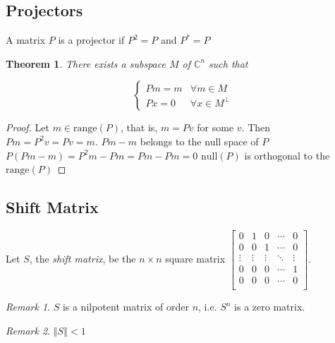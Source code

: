 \documentclass[twofold]{article}
\newcommand*\adj[1]{#1^*}
\newcommand*\norm[1]{\left \Vert #1 \right\Vert}
\theoremstyle{plain}
\newtheorem{theorem}{Theorem}
\theoremstyle{definition}
\theoremstyle{remark}
\newtheorem*{remark}{Remark}
\begin{document}
\subsection{Projectors}
A matrix \(P\) is a projector if \(P^2 = P\) and \(\adj{P} = P\)

\begin{theorem} There exists a subspace \(M\) of \(\mathbb{C}^n\) such that 

\[\begin{cases}
Pm = m & \forall m \in M \\
Px = 0 & \forall x \in M^\perp 
\end{cases}\] 
\end{theorem}
\begin{proof} Let \(m \in \mathrm{range}(P)\), that is, \(m= Pv\) for some \(v\). Then \(Pm = P^2 v = Pv = m\). 
\(Pm - m\) belongs to the null space of \(P\)
\(P(Pm -m) = P^2m - Pm = Pm - Pm = 0\)  
\(\mathrm{null}(P)\) is orthogonal to the \(\mathrm{range}(P)\)
 \end{proof}

\subsection{Shift Matrix}
Let \(S\), the {\em shift matrix},  be the \(n \times n\) square matrix \( \begin{bmatrix} 
0 & 1 & 0 & \cdots & 0 \\
0 & 0 & 1 & \cdots & 0 \\
\vdots & \vdots & \vdots &\ddots & \vdots \\
0 & 0 & 0 &\cdots & 1 \\
0 & 0 & 0 & \cdots & 0 \\ 
\end{bmatrix}\). 

 \begin{remark} \(S\) is a nilpotent matrix of order \(n\), i.e. \(S^n\) is a zero matrix. \end{remark}

\begin{remark} \(\norm{S} < 1\) \end{remark}
\end{document}
